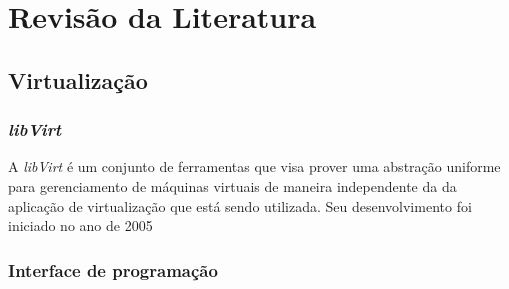 %
%

\chapter{Revisão da Literatura}



\section{Virtualização}

% 

\subsection{\emph{libVirt}}


A \emph{libVirt} é um conjunto de ferramentas que visa prover uma abstração
uniforme para gerenciamento de máquinas virtuais de maneira independente da
da aplicação de virtualização que está sendo utilizada. Seu desenvolvimento
foi iniciado no ano de 2005

\subsection{Interface de programação}



